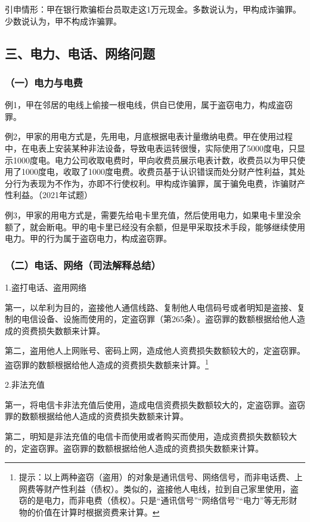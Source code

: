 引申情形：甲在银行欺骗柜台员取走这1万元现金。多数说认为，甲构成诈骗罪。少数说认为，甲不构成诈骗罪。

\subsection*{三、电力、电话、网络问题}

\subsubsection*{（一）电力与电费}

例1，甲在邻居的电线上偷接一根电线，供自已使用，属于盗窃电力，构成盗窃罪。

例2，甲家的用电方式是，先用电，月底根据电表计量缴纳电费。甲在使用过程中，在电表上安装某种非法设备，导致电表运转很慢，实际使用了5000度电，只显示1000度电。电力公司收取电费时，甲向收费员展示电表计数，收费员以为甲只使用了1000度电，收取了1000度电费。收费员基于认识错误而处分财产性利益，其处分行为表现为不作为，亦即不行使权利。甲构成诈骗罪，属于骗免电费，诈骗财产性利益。（2021年试题）

例3，甲家的用电方式是，需要先给电卡里充值，然后使用电力，如果电卡里没余额了，就会断电。甲的电卡里已经没有余额，但是甲采取技术手段，能够继续使用电力。甲的行为属于盗窃电力，构成盗窃罪。

\subsubsection*{（二）电话、网络（司法解释总结）}

1.盗打电话、盗用网络

第一，以牟利为目的，盗接他人通信线路、复制他人电信码号或者明知是盗接、复制的电信设备、设施而使用的，定盗窃罪（第265条）。盗窃罪的数额根据给他人造成的资费损失数额来计算。

第二，盗用他人上网账号、密码上网，造成他人资费损失数额较大的，定盗窃罪。盗窃罪的数额根据给他人造成的资费损失数额来计算。\footnote{提示：以上两种盗窃（盗用）的对象是通讯信号、网络信号，而非电话费、上网费等财产性利益（债权）。类似的，盗接他人电线，拉到自己家里使用，盗窃的是电力，而非电费（债权）。只是“通讯信号”“网络信号”“电力”等无形财物的价值在计算时根据资费来计算。}

2.非法充值

第一，将电信卡非法充值后使用，造成电信资费损失数额较大的，定盗窃罪。盗窃罪的数额根据给他人造成的资费损失数额来计算。

第二，明知是非法充值的电信卡而使用或者购买而使用，造成资费损失数额较大的，定盗窃罪。盗窃罪的数额根据给他人造成的资费损失数额来计算。

